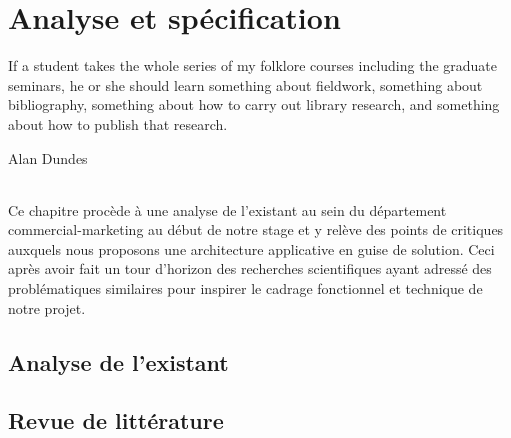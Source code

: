 \chapter{Analyse et spécification}
\epigraph{If a student takes the whole series of my folklore courses including the graduate seminars, he or she should learn something about fieldwork, something about bibliography, something about how to carry out library research, and something about how to publish that research.}{Alan Dundes}
\subparagraph{}
Ce chapitre procède à une analyse de l'existant au sein du département commercial-marketing au début de notre stage et y relève des points de critiques auxquels nous proposons une architecture applicative en guise de solution. Ceci après avoir fait un tour d'horizon des recherches scientifiques ayant adressé des problématiques similaires pour inspirer le cadrage fonctionnel et technique de notre projet.
\cleardoublepage

\section{Analyse de l’existant}
\section{Revue de littérature}
